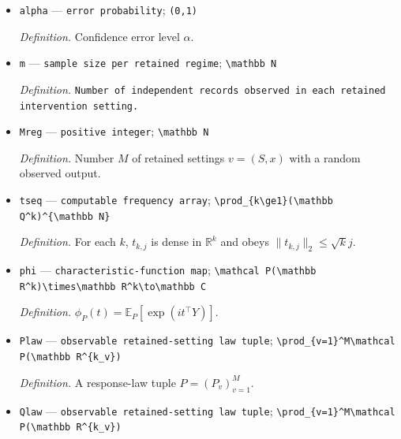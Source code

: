 \documentclass{article}
\begin{document}
\begin{itemize}
  \par\smallskip\noindent\emph{Definition.} Upper Laplace scale \(s_+\).
  \item \texttt{alpha} --- \texttt{error probability}; \texttt{(0,\allowbreak{}1)}
  \par\smallskip\noindent\emph{Definition.} Confidence error level \(\alpha\).
  \item \texttt{m} --- \texttt{sample size per retained regime}; \texttt{\textbackslash{}\allowbreak{}mathbb N}
  \par\smallskip\noindent\emph{Definition.} \texttt{Number of independent records observed in each retained intervention setting.}
  \item \texttt{Mreg} --- \texttt{positive integer}; \texttt{\textbackslash{}\allowbreak{}mathbb N}
  \par\smallskip\noindent\emph{Definition.} Number \(M\) of retained settings \(v=(S,x)\) with a random observed output.
  \item \texttt{tseq} --- \texttt{computable frequency array}; \texttt{\textbackslash{}\allowbreak{}prod\_\allowbreak{}\{k\textbackslash{}\allowbreak{}ge1\}\allowbreak{}(\textbackslash{}\allowbreak{}mathbb Q\textasciicircum{}k)\textasciicircum{}\{\textbackslash{}\allowbreak{}mathbb N\}\allowbreak{}}
  \par\smallskip\noindent\emph{Definition.} For each \(k\), \(t_{k,j}\) is dense in \(\mathbb R^k\) and obeys \(\|t_{k,j}\|_2\le\sqrt{k}j\).
  \item \texttt{phi} --- \texttt{characteristic-\allowbreak{}function map}; \texttt{\textbackslash{}\allowbreak{}mathcal P(\textbackslash{}\allowbreak{}mathbb R\textasciicircum{}k)\textbackslash{}\allowbreak{}times\textbackslash{}\allowbreak{}mathbb R\textasciicircum{}k\textbackslash{}\allowbreak{}to\textbackslash{}\allowbreak{}mathbb C}
  \par\smallskip\noindent\emph{Definition.} \(\phi_P(t)=\mathbb E_P[\exp(i t^\top Y)]\).
  \item \texttt{Plaw} --- \texttt{observable retained-\allowbreak{}setting law tuple}; \texttt{\textbackslash{}\allowbreak{}prod\_\allowbreak{}\{v=\allowbreak{}1\}\allowbreak{}\textasciicircum{}M\textbackslash{}\allowbreak{}mathcal P(\textbackslash{}\allowbreak{}mathbb R\textasciicircum{}\{k\_\allowbreak{}v\}\allowbreak{})}
  \par\smallskip\noindent\emph{Definition.} A response-law tuple \(P=(P_v)_{v=1}^M\).
  \item \texttt{Qlaw} --- \texttt{observable retained-\allowbreak{}setting law tuple}; \texttt{\textbackslash{}\allowbreak{}prod\_\allowbreak{}\{v=\allowbreak{}1\}\allowbreak{}\textasciicircum{}M\textbackslash{}\allowbreak{}mathcal P(\textbackslash{}\allowbreak{}mathbb R\textasciicircum{}\{k\_\allowbreak{}v\}\allowbreak{})}

\end{itemize}
\end{document}
